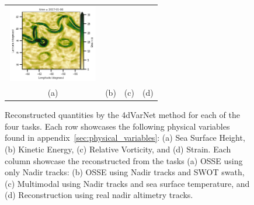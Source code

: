 \begin{figure}[ht!]
\begin{center}
\begin{tabular}{cccc}
\includegraphics[trim={13mm 0 0 5mm},clip,width=4.0cm,height=3.4cm]{content/figures/fourdvarnet_figs/ose_gf_strain.png} \\
(a) & (b) & (c) & (d)
\end{tabular}
\vspace{-3mm}
\caption{
Reconstructed quantities by the 4dVarNet method for each of the four tasks.
Each row showcases the following physical variables found in appendix~\ref{sec:physical_variables}: (a) Sea Surface Height, (b) Kinetic Energy, (c) Relative Vorticity, and (d) Strain. 
Each column showcase the reconstructed from the tasks (a) OSSE using only Nadir tracks: (b) OSSE using Nadir tracks and SWOT swath, (c) Multimodal using Nadir tracks and sea surface temperature, and (d) Reconstruction using real nadir altimetry tracks.}
\vspace{-5mm}
\label{fig:oceanbench_maps_4dvarnet}
\end{center}
\end{figure}





% 


